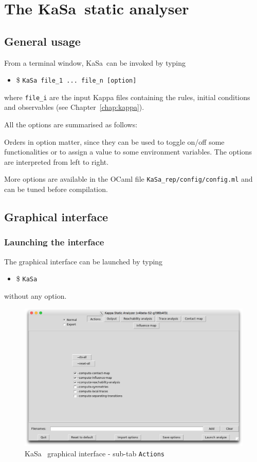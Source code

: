 \documentclass[11pt]{book}
\def\KaSa{\textsf{KaSa}}
\def\ttt#1{\texttt{#1}}
\def\ITE#1{\begin{itemize}#1\end{itemize}}
\begin{document}
\chapter{The \KaSa~static analyser}

\section{General usage}

From a terminal window, \KaSa~can be invoked by typing
\ITE{
\item[\$] \ttt{KaSa file\_1 ... file\_n  [option]}
}
where \ttt{file\_i} are the input Kappa files containing the rules, initial conditions and observables (see Chapter~\ref{chap:kappa}).

All the options are summarised as follows:


Orders in option matter, since they can be used to toggle on/off some functionalities or to assign a value to some environment variables.
The options are interpreted from left to right.

More options are available in the OCaml file \texttt{KaSa\_rep/config/config.ml} and can be tuned before compilation.

\section{Graphical interface}

\subsection{Launching the interface}

The graphical interface can be launched by typing
\ITE{\item[\$] \ttt{KaSa}}

without any option.

\begin{figure}[htbp]
\centering
\includegraphics[width=12cm,bb=0 0 1904 1208]{img/kasa_0.png}
\caption{\KaSa~ graphical interface - sub-tab \texttt{Actions}}
\label{fig:kasa:0}
\end{figure}
\end{document}
